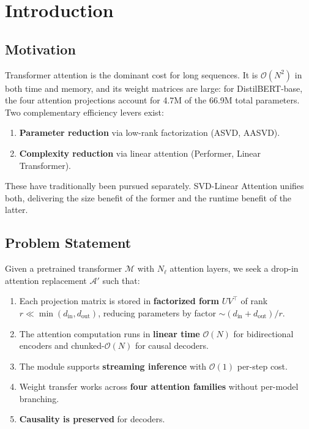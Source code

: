 
\section{Introduction}

\subsection{Motivation}

Transformer attention is the dominant cost for long sequences. It is 
$\mathcal{O}(N^2)$ in both time and memory, and its weight matrices are large: 
for DistilBERT-base, the four attention projections account for 4.7M of the 
66.9M total parameters. Two complementary efficiency levers exist:

\begin{enumerate}
\item \textbf{Parameter reduction} via low-rank factorization (ASVD, AASVD).
\item \textbf{Complexity reduction} via linear attention (Performer, Linear Transformer).

\end{enumerate}
These have traditionally been pursued separately. SVD-Linear Attention unifies 
both, delivering the size benefit of the former and the runtime benefit of the 
latter.

\subsection{Problem Statement}

Given a pretrained transformer $\mathcal{M}$ with $N_\ell$ attention layers, 
we seek a drop-in attention replacement $\mathcal{A}'$ such that:

\begin{enumerate}
\item Each projection matrix is stored in \textbf{factorized form} $UV^\top$ of rank
  $r \ll \min(d_\text{in}, d_\text{out})$, reducing parameters by factor
  $\sim (d_\text{in} + d_\text{out})/r$.
\item The attention computation runs in \textbf{linear time} $\mathcal{O}(N)$ for
  bidirectional encoders and chunked-$\mathcal{O}(N)$ for causal decoders.
\item The module supports \textbf{streaming inference} with $\mathcal{O}(1)$ per-step
  cost.
\item Weight transfer works across \textbf{four attention families} without
  per-model branching.
\item \textbf{Causality is preserved} for decoders.

\end{enumerate}
